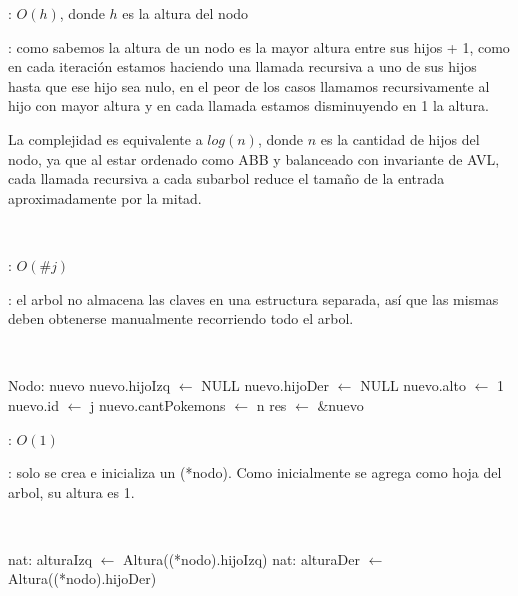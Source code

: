 \begin{Algoritmos}
	\complejidad: $O(h)$, donde $h$ es la altura del nodo

	\justifcomp: como sabemos la altura de un nodo es la mayor altura entre sus hijos + 1, como en cada iteración estamos haciendo una llamada recursiva a uno de sus hijos hasta que ese hijo sea nulo, en el peor de los casos llamamos recursivamente al hijo con mayor altura y en cada llamada estamos disminuyendo en 1 la altura.

	La complejidad es equivalente a $log(n)$, donde $n$ es la cantidad de hijos del nodo, ya que al estar ordenado como ABB y balanceado con invariante de AVL, cada llamada recursiva a cada subarbol reduce el tamaño de la entrada aproximadamente por la mitad.

	~

	\begin{algorithm}[H]
		\NoCaptionOfAlgo
		\caption{}
		\BlankLine
	\end{algorithm}
	
	\complejidad: $O(\#j)$

	\justifcomp: el arbol no almacena las claves en una estructura separada, así que las mismas deben obtenerse manualmente recorriendo todo el arbol.

	~

	\begin{algorithm}[H]
		\NoCaptionOfAlgo
		\caption{}
		\BlankLine
		Nodo: nuevo
		nuevo.hijoIzq $\leftarrow$ NULL
		nuevo.hijoDer $\leftarrow$ NULL
		nuevo.alto $\leftarrow$ 1
		nuevo.id $\leftarrow$ j
		nuevo.cantPokemons $\leftarrow$ n
		res $\leftarrow$ \&nuevo
	\end{algorithm}
	
	\complejidad: $O(1)$

	\justifcomp: solo se crea e inicializa un (*nodo). Como inicialmente se agrega como hoja del arbol, su altura es 1.

	~

	\begin{algorithm}[H]
		\NoCaptionOfAlgo
		\caption{}
		\BlankLine
		nat: alturaIzq $\leftarrow$ Altura((*nodo).hijoIzq)
		nat: alturaDer $\leftarrow$ Altura((*nodo).hijoDer)
	\end{algorithm}
	

\end{Algoritmos}
